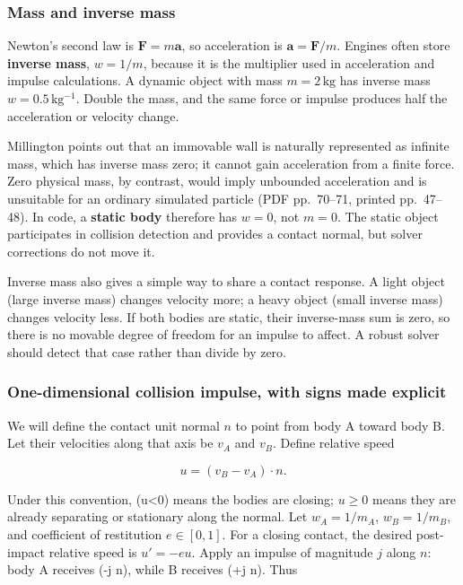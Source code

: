 \subsubsection{Mass and inverse mass}\label{mass-and-inverse-mass}

Newton's second law is \(\mathbf{F}=m\mathbf{a}\), so acceleration is \(\mathbf{a}=\mathbf{F}/m\). Engines often store \textbf{inverse mass}, \(w=1/m\), because it is the multiplier used in acceleration and impulse calculations. A dynamic object with mass \(m=2\,\mathrm{kg}\) has inverse mass \(w=0.5\,\mathrm{kg^{-1}}\). Double the mass, and the same force or impulse produces half the acceleration or velocity change.

Millington points out that an immovable wall is naturally represented as infinite mass, which has inverse mass zero; it cannot gain acceleration from a finite force. Zero physical mass, by contrast, would imply unbounded acceleration and is unsuitable for an ordinary simulated particle (PDF pp.~70--71, printed pp.~47--48). In code, a \textbf{static body} therefore has \(w=0\), not \(m=0\). The static object participates in collision detection and provides a contact normal, but solver corrections do not move it.

Inverse mass also gives a simple way to share a contact response. A light object (large inverse mass) changes velocity more; a heavy object (small inverse mass) changes velocity less. If both bodies are static, their inverse-mass sum is zero, so there is no movable degree of freedom for an impulse to affect. A robust solver should detect that case rather than divide by zero.

\subsubsection{One-dimensional collision impulse, with signs made explicit}\label{one-dimensional-collision-impulse-with-signs-made-explicit}

We will define the contact unit normal \(n\) to point from body A toward body B. Let their velocities along that axis be \(v_A\) and \(v_B\). Define relative speed

\[
u=(v_B-v_A)\cdot n.
\]

Under this convention, (u\textless0) means the bodies are closing; \(u\ge 0\) means they are already separating or stationary along the normal. Let \(w_A=1/m_A\), \(w_B=1/m_B\), and coefficient of restitution \(e\in[0,1]\). For a closing contact, the desired post-impact relative speed is \(u'=-e u\). Apply an impulse of magnitude \(j\) along \(n\): body A receives (-j n), while B receives (+j n). Thus

